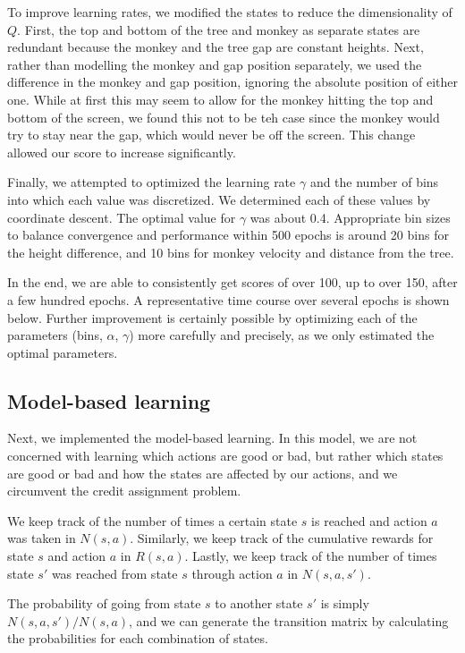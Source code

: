 \documentclass[11pt]{amsart}
\begin{document}
To improve learning rates, we modified the states to reduce the dimensionality of $Q$. First, the top and bottom of the tree and monkey as separate states are redundant because the monkey and the tree gap are constant heights. Next, rather than modelling the monkey and gap position separately, we used the difference in the monkey and gap position, ignoring the absolute position of either one. While at first this may seem to allow for the monkey hitting the top and bottom of the screen, we found this not to be teh case since the monkey would try to stay near the gap, which would never be off the screen. This change allowed our score to increase significantly.

Finally, we attempted to optimized the learning rate $\gamma$ and the number of bins into which each value was discretized. We determined each of these values by coordinate descent. The optimal value for $\gamma$ was about 0.4.  Appropriate bin sizes to balance convergence and performance within 500 epochs is around 20 bins for the height difference, and 10 bins for monkey velocity and distance from the tree.

In the end, we are able to consistently get scores of over 100, up to over 150, after a few hundred epochs. A representative time course over several epochs is shown below. Further improvement is certainly possible by optimizing each of the parameters (bins, $\alpha$, $\gamma$) more carefully and precisely, as we only estimated the optimal parameters.


\subsection{Model-based learning}

Next, we implemented the model-based learning. In this model, we are not concerned with learning which actions are good or bad, but rather which states are good or bad and how the states are affected by our actions, and we circumvent the credit assignment problem. 

We keep track of the number of times a certain state $s$ is reached and action $a$ was taken in $N(s,a)$. Similarly, we keep track of the cumulative rewards for state $s$ and action $a$ in $R(s,a)$. Lastly, we keep track of the number of times state $s'$ was reached from state $s$ through action $a$ in $N(s,a,s')$. 

The probability of going from state $s$ to another state $s'$ is simply $N(s,a,s')/N(s,a)$, and we can generate the transition matrix by calculating the probabilities for each combination of states.
\end{document}
